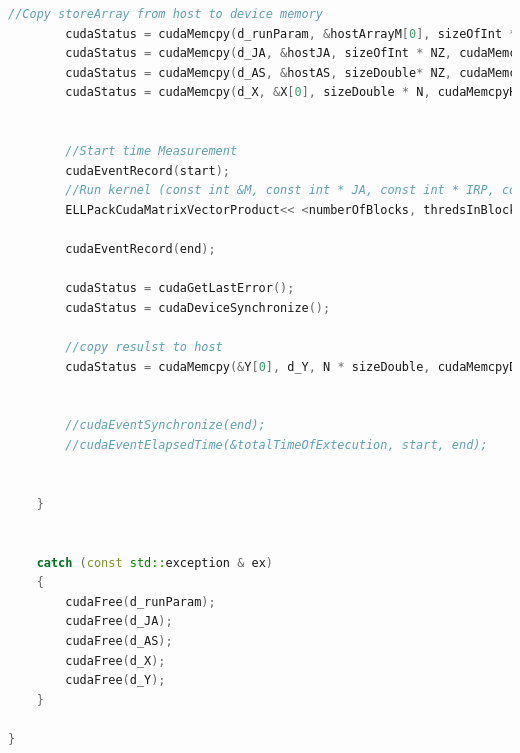 \documentclass{scrreprt}
\begin{document}
\begin{lstlisting}[language=C++, caption=CudaSolver.cu]
		//Copy storeArray from host to device memory
		cudaStatus = cudaMemcpy(d_runParam, &hostArrayM[0], sizeOfInt * 3, cudaMemcpyHostToDevice);
		cudaStatus = cudaMemcpy(d_JA, &hostJA, sizeOfInt * NZ, cudaMemcpyHostToDevice);
		cudaStatus = cudaMemcpy(d_AS, &hostAS, sizeDouble* NZ, cudaMemcpyHostToDevice);
		cudaStatus = cudaMemcpy(d_X, &X[0], sizeDouble * N, cudaMemcpyHostToDevice);


		//Start time Measurement 
		cudaEventRecord(start);
		//Run kernel (const int &M, const int * JA, const int * IRP, const int * AS, double * OUT, double * IN)
		ELLPackCudaMatrixVectorProduct<< <numberOfBlocks, thredsInBlock, blockSize * sizeDouble >> > (M, NZ, d_JA, d_AS, d_X, d_Y, maxBlocks);

		cudaEventRecord(end);

		cudaStatus = cudaGetLastError();
		cudaStatus = cudaDeviceSynchronize();

		//copy resulst to host
		cudaStatus = cudaMemcpy(&Y[0], d_Y, N * sizeDouble, cudaMemcpyDeviceToHost);


		//cudaEventSynchronize(end);
		//cudaEventElapsedTime(&totalTimeOfExtecution, start, end);


	}


	catch (const std::exception & ex)
	{
		cudaFree(d_runParam);
		cudaFree(d_JA);
		cudaFree(d_AS);
		cudaFree(d_X);
		cudaFree(d_Y);
	}

}





\end{lstlisting}
\end{document}
